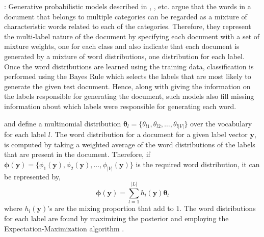  : Generative probabilistic models 
described in \citet{mccallum1999multi}, \citet{nigam1999using}, 
\citet{ueda2002parametric} etc. argue that the words in a document 
that belongs to multiple categories can be regarded as a mixture of 
characteristic words related to each of the categories. Therefore, 
they represent the multi-label nature of the document by specifying 
each document with a set of mixture weights, one for each class and 
also indicate that each document is generated by a mixture of word 
distributions, one distribution for each label. Once the word 
distributions are learned using the training data, classification is 
performed using the Bayes Rule which selects the labels that are most 
likely to generate the given test document. Hence, along with giving 
the information on the labels responsible for generating the document, 
such models also fill missing information about which labels were 
responsible for generating each word.

\citet{mccallum1999multi} and \citet{ueda2002parametric} define a multinomial 
distribution $\boldsymbol{\theta}_{l} = \{\theta_{l1}, \theta_{l2}, \ldots, 
\theta_{l|V|}\}$ over the vocabulary for each label $l$. The word 
distribution for a document for a given label vector $\boldsymbol{y}$, 
is computed by taking a weighted average of the word distributions of 
the labels that are present in the document. Therefore, if $\boldsymbol
{\phi}(\boldsymbol{y}) = \{\phi_{1}(\boldsymbol{y}), \phi_{2}(\boldsymbol{y}), 
\ldots, \phi_{|V|}(\boldsymbol{y})\}$ is the required word distribution, it can be represented by, 
\begin{equation}
\boldsymbol{\phi}(\boldsymbol{y}) = \sum_{l=1}^{|L|} h_{l}(\boldsymbol{y})\boldsymbol{\theta}_{l}
\end{equation}
where $h_{l}(\boldsymbol{y})$'s are the mixing proportion that add to $1$. 
The word distributions for each label are found by maximizing the 
posterior \citep{ueda2002parametric} and employing the 
Expectation-Maximization algorithm \citep{mccallum1999multi}.


